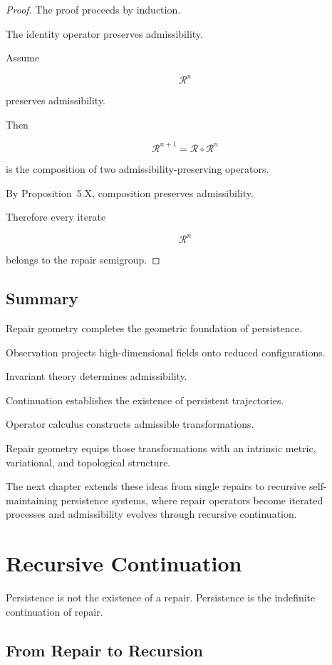 \documentclass[11pt]{book}
\numberwithin{equation}{chapter}
\theoremstyle{definition}
\theoremstyle{plain}
\begin{document}
\begin{proof}

The proof proceeds by induction.

The identity operator preserves admissibility.

Assume

\[
\mathcal R^n
\]

preserves admissibility.

Then

\[
\mathcal R^{n+1}
=
\mathcal R
\circ
\mathcal R^n
\]

is the composition of two admissibility-preserving operators.

By Proposition~5.X, composition preserves admissibility.

Therefore every iterate

\[
\mathcal R^n
\]

belongs to the repair semigroup.

\end{proof}

\section{Summary}

Repair geometry completes the geometric foundation of persistence.

Observation projects high-dimensional fields onto reduced
configurations.

Invariant theory determines admissibility.

Continuation establishes the existence of persistent trajectories.

Operator calculus constructs admissible transformations.

Repair geometry equips those transformations with an intrinsic metric,
variational, and topological structure.

The next chapter extends these ideas from single repairs to recursive
self-maintaining persistence systems, where repair operators become
iterated processes and admissibility evolves through recursive
continuation.

\chapter{Recursive Continuation}

\epigraph{%
Persistence is not the existence of a repair.
Persistence is the indefinite continuation of repair.
}{}

\section{From Repair to Recursion}
\end{document}
